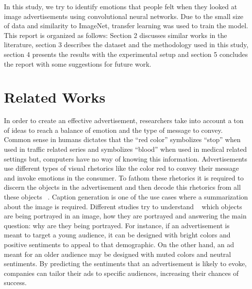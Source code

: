 \documentclass[conference]{IEEEtran}
\begin{document}
In this study, we try to identify emotions that people felt when they looked 
at image advertisements using convolutional neural networks. Due to the small 
size of data and similarity to ImageNet, transfer learning was used to train the model.
This report is organized as follows: Section 2 discusses similar works in the literature, 
section 3 describes the dataset and the methodology used in this study, section 4 
presents the results with the experimental setup and section 5 concludes the report with 
some suggestions for future work.

\section{Related Works}

In order to create an effective advertisement, researchers take into account a 
ton of ideas to reach a balance of emotion and the type of message to convey. Common 
sense in humans dictates that the “red color” symbolizes “stop” when used in 
traffic related series and symbolizes “blood” when used in medical related settings 
but, computers have no way of knowing this information. Advertisements use different 
types of visual rhetorics like the color red to convey their message and invoke 
emotions in the consumer. To fathom these rhetorics it is required to discern
the objects in the advertisement and then decode this rhetorics from all these 
objects \cite{b4}~\cite{b5}. Caption generation is one of the use cases where 
 a summarization about the image is required. Different studies try to understand 
 \cite{b6}~\cite{b7} which objects are being portrayed in an image, how they 
are portrayed and answering the main question: why are they being portrayed. 
For instance, if an advertisement is meant to target a young audience, it can be 
designed with bright colors and positive sentiments to appeal to that demographic. 
On the other hand, an ad meant for an older audience may be designed with muted 
colors and neutral sentiments. By predicting the sentiments that an advertisement 
is likely to evoke, companies can tailor their ads to specific audiences, increasing 
their chances of success.
\end{document}
